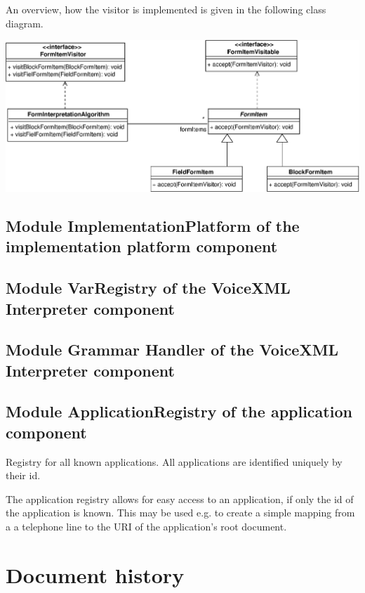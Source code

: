 \documentclass[11pt,a4paper]{article}
\begin{document}
An overview, how the visitor is implemented is given in the following
class diagram.

\begin{center}
\includegraphics[scale=0.5]{class-interpreter-visitor.eps}
\end{center}

\subsection{Module ImplementationPlatform of the implementation platform 
component}


\subsection{Module VarRegistry of the VoiceXML Interpreter component}
\label{sec:module-varr-voic}

\subsection{Module Grammar Handler of the 
VoiceXML Interpreter component}

\subsection{Module ApplicationRegistry of the application component}

Registry for all known applications. All applications are identified
uniquely by their id.

The application registry allows for easy access to an application,
if only the id of the application is known. This may be used e.g. to
create a simple mapping from a a telephone line to the URI of the
application's root document.


\section*{Document history}
\end{document}
